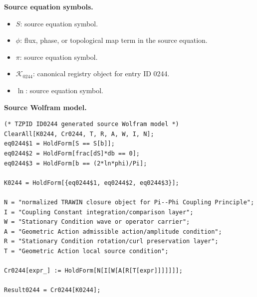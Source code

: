 \begin{minipage}[t]{0.49\linewidth}
\begingroup
\small
\raggedright
\textbf{Source equation symbols.}\par
\begin{itemize}[leftmargin=1.35em,itemsep=1pt,topsep=1pt,parsep=0pt]
    \item $S$: source equation symbol.
    \item $\phi$: flux, phase, or topological map term in the source equation.
    \item $\pi$: source equation symbol.
    \item $\mathcal{K}_{0244}$: canonical registry object for entry ID 0244.
    \item $\ln$: source equation symbol.
\end{itemize}
\endgroup
\end{minipage}\hfill
\begin{minipage}[t]{0.47\linewidth}
\begingroup
\scriptsize
\raggedright
\textbf{Source Wolfram model.}\par
\begin{Verbatim}[fontsize=\tiny,breaklines=true,breakanywhere=true]
(* TZPID ID0244 generated source Wolfram model *)
ClearAll[K0244, Cr0244, T, R, A, W, I, N];
eq0244$1 = HoldForm[S == S[b]];
eq0244$2 = HoldForm[frac[dS]*db == 0];
eq0244$3 = HoldForm[b == (2*ln*phi)/Pi];

K0244 = HoldForm[{eq0244$1, eq0244$2, eq0244$3}];

N = "normalized TRAWIN closure object for Pi--Phi Coupling Principle";
I = "Coupling Constant integration/comparison layer";
W = "Stationary Condition wave or operator carrier";
A = "Geometric Action admissible action/amplitude condition";
R = "Stationary Condition rotation/curl preservation layer";
T = "Geometric Action local source condition";

Cr0244[expr_] := HoldForm[N[I[W[A[R[T[expr]]]]]]];

Result0244 = Cr0244[K0244];
\end{Verbatim}
\endgroup
\end{minipage}

